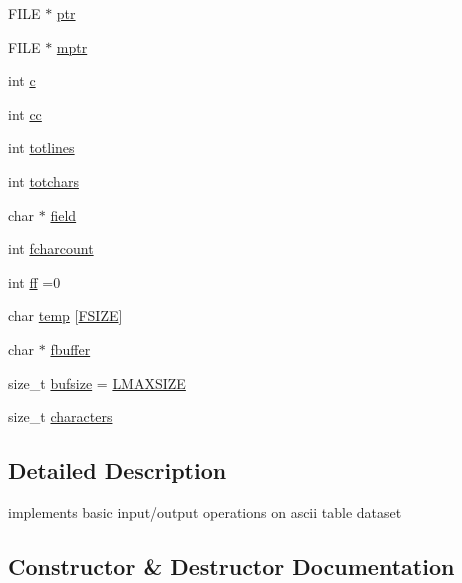 \begin{DoxyCompactItemize}
\item 
F\+I\+LE $\ast$ \hyperlink{classASCIITable_a672404b4ac0a24a0a3c81e50bfd1b2b8}{ptr}
\item 
F\+I\+LE $\ast$ \hyperlink{classASCIITable_a04d11d104ccb60f633263ca6d587a32e}{mptr}
\item 
int \hyperlink{classASCIITable_a4a1eb92503380ccbaa2721d10fee49b8}{c}
\item 
int \hyperlink{classASCIITable_a38da99707762305ba28422e5cfef6750}{cc}
\item 
int \hyperlink{classASCIITable_a130cbac5edad2ce441d7532c0d8b7ba9}{totlines}
\item 
int \hyperlink{classASCIITable_a8393e5afb07999bed80a0af466e0f019}{totchars}
\item 
char $\ast$ \hyperlink{classASCIITable_afcf7be4eb13da8b6fe21de74b30ecd4b}{field}
\item 
int \hyperlink{classASCIITable_a8ea5c55891e4e010dca14f6b76c7eb45}{fcharcount}
\item 
int \hyperlink{classASCIITable_ae08a482aec894d37c069a82c8cb626af}{ff} =0
\item 
char \hyperlink{classASCIITable_adfa0ae29066634586e41df5badb9bcbc}{temp} \mbox{[}\hyperlink{asciitable_8h_a7de6f71b3f223ff342d8517e2706252d}{F\+S\+I\+ZE}\mbox{]}
\item 
char $\ast$ \hyperlink{classASCIITable_a32643771c6f77397883fec75c748c062}{fbuffer}
\item 
size\+\_\+t \hyperlink{classASCIITable_a13248c4b9e80f4097227d339dfdaa9f6}{bufsize} = \hyperlink{asciitable_8h_ad3273464643b12407cb405d8c298f943}{L\+M\+A\+X\+S\+I\+ZE}
\item 
size\+\_\+t \hyperlink{classASCIITable_a644aab2a8b33c2a7babfd400a09e1e1a}{characters}
\end{DoxyCompactItemize}


\subsection{Detailed Description}
implements basic input/output operations on ascii table dataset 

\subsection{Constructor \& Destructor Documentation}
\mbox{\label{classASCIITable_af6407338748ab521c979053e9b559ea7}} 
